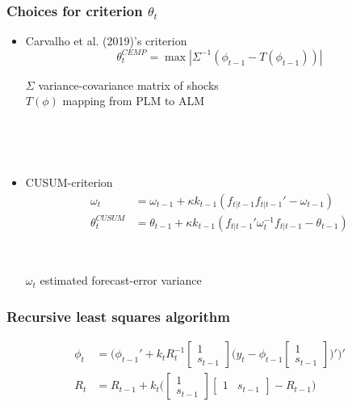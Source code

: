 \documentclass[10pt]{beamer}
\begin{document}
\begin{frame}[plain]  %
	\frametitle{Choices for criterion $\theta_t$}
	\label{g}
\begin{itemize}
\item Carvalho et al. (2019)'s criterion  
\begin{equation}
\theta_t^{CEMP} = \max | \Sigma^{-1} ( \phi_{t-1} - T(\phi_{t-1})) |
\end{equation}


$\Sigma$ variance-covariance matrix of shocks \\
$T(\phi)$ mapping from PLM to ALM

\

\

\item CUSUM-criterion
\begin{align}
\omega_t & =  \omega_{t-1} + \kappa k_{t-1}(f_{t|t-1} f_{t|t-1}'  -\omega_{t-1})\\
\theta_t^{CUSUM} & =  \theta_{t-1} + \kappa k_{t-1}(f_{t|t-1}'\omega_t^{-1}f_{t|t-1} -\theta_{t-1})
\end{align}

\

$\omega_t$ estimated forecast-error variance
\end{itemize}




\vfill

\hyperlink{anchoring1}{}	


\end{frame}

\begin{frame}[plain]  %
	\frametitle{Recursive least squares algorithm}
	\label{RLS}


\begin{align}
\phi_t  & = \bigg( \phi_{t-1}' + k_t R_t^{-1}\begin{bmatrix} 1 \\ s_{t-1} \end{bmatrix}\bigg(y_{t} - \phi_{t-1} \begin{bmatrix} 1 \\ s_{t-1} \end{bmatrix} \bigg)' \bigg)' \\
R_t &= R_{t-1} +  k_t \bigg( \begin{bmatrix} 1 \\ s_{t-1} \end{bmatrix} \begin{bmatrix} 1 & s_{t-1} \end{bmatrix}  - R_{t-1} \bigg)
\end{align}


\vfill

\hyperlink{RLS_special}{}	


\end{frame}
\end{document}
